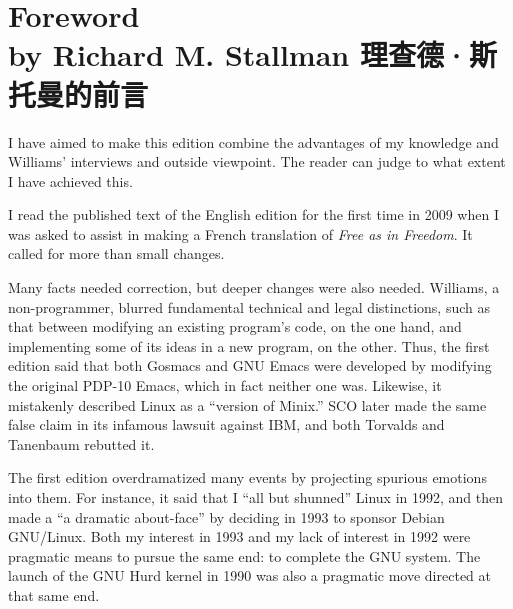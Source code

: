 \chapter[Foreword by Richard M. Stallman]{\ifdefined\eng
Foreword\\by Richard M. Stallman
\fi
\ifdefined\chs
理查德·斯托曼的前言
\fi}

\ifdefined\eng
I have aimed to make this edition combine the advantages of my
knowledge and Williams' interviews and outside viewpoint.  The reader
can judge to what extent I have achieved this.
\fi

\ifdefined\chs

\fi

\ifdefined\eng
I read the published text of the English edition for the first time in
2009 when I was asked to assist in making a French translation of \textit{Free
as in Freedom}.  It called for more than small changes.
\fi

\ifdefined\chs

\fi

\ifdefined\eng
Many facts needed correction, but deeper changes were also needed.
Williams, a non-programmer, blurred fundamental technical and legal
distinctions, such as that between modifying an existing program's
code, on the one hand, and implementing some of its ideas in a new
program, on the other.  Thus, the first edition said that both Gosmacs
and GNU Emacs were developed by modifying the original PDP-10 Emacs,
which in fact neither one was.  Likewise, it mistakenly
described Linux as a ``version of Minix.''  SCO later made the same
false claim in its infamous lawsuit against IBM, and both Torvalds and
Tanenbaum rebutted it.
\fi

\ifdefined\chs

\fi

\ifdefined\eng
The first edition overdramatized many events by projecting spurious
emotions into them.  For instance, it said that I ``all but shunned''
Linux in 1992, and then made a ``a dramatic about-face'' by deciding in
1993 to sponsor Debian GNU/Linux.  Both my interest in 1993 and my
lack of interest in 1992 were pragmatic means to pursue the same end:
to complete the GNU system.  The launch of the GNU Hurd kernel in 1990
was also a pragmatic move directed at that same end.
\fi

